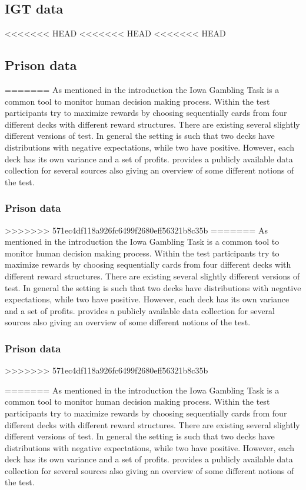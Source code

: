 \documentclass[12pt,a4paper,bibliography=totocnumbered,listof=totocnumbered]{scrartcl}
\begin{document}
\subsection{IGT data}

<<<<<<< HEAD
<<<<<<< HEAD
<<<<<<< HEAD
\subsection{Prison data}
=======
As mentioned in the introduction the Iowa Gambling Task is a common tool to monitor human decision making process. Within the test participants try to maximize rewards by choosing sequentially cards from four different decks with different reward structures. There are existing several slightly different versions of test. In general the setting is such that two decks have distributions with negative expectations, while two have positive. However, each deck has its own variance and a set of profits. \cite{Steingroever2015} provides a publicly available data collection for several sources also giving an overview of some different notions of the test.

\subsubsection{Prison data}
>>>>>>> 571ec4df118a926fc6499f2680eff56321b8c35b
=======
As mentioned in the introduction the Iowa Gambling Task is a common tool to monitor human decision making process. Within the test participants try to maximize rewards by choosing sequentially cards from four different decks with different reward structures. There are existing several slightly different versions of test. In general the setting is such that two decks have distributions with negative expectations, while two have positive. However, each deck has its own variance and a set of profits. \cite{Steingroever2015} provides a publicly available data collection for several sources also giving an overview of some different notions of the test.

\subsubsection{Prison data}
>>>>>>> 571ec4df118a926fc6499f2680eff56321b8c35b

=======
As mentioned in the introduction the Iowa Gambling Task is a common tool to monitor human decision making process. Within the test participants try to maximize rewards by choosing sequentially cards from four different decks with different reward structures. There are existing several slightly different versions of test. In general the setting is such that two decks have distributions with negative expectations, while two have positive. However, each deck has its own variance and a set of profits. \cite{Steingroever2015} provides a publicly available data collection for several sources also giving an overview of some different notions of the test.
\end{document}
